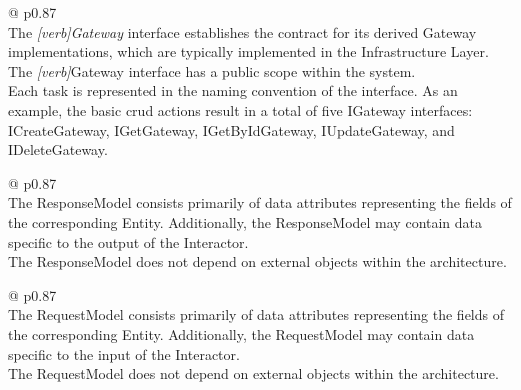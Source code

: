 \begin{table}[H]
    \begin{tabular}{@{\makebox[2em][c]{\rownumber\space}}  p{0.87\linewidth}}
        \\ 
    \hline
    The \textit{[\gls{verb}]Gateway} interface establishes the contract for its derived Gateway
    implementations, which are typically implemented in the Infrastructure Layer. \\

    The \textit{[\gls{verb}]}Gateway interface has a public scope within the system. \\
    
    Each task is represented in the naming convention of the interface. As an example, the
    basic \gls{crud} actions result in a total of five IGateway interfaces: ICreateGateway,
    IGetGateway, IGetByIdGateway, IUpdateGateway, and IDeleteGateway. \\
    \hline
    \end{tabular}
\caption{\textit{[\gls{verb}]}Gateway Requirements}
\label{table_requirements_IGateway}
\end{table}

\begin{table}[H]
    \begin{tabular}{@{\makebox[2em][c]{\rownumber\space}}  p{0.87\linewidth}}
        \\ 
    \hline
    The ResponseModel consists primarily of data attributes representing the fields of the
    corresponding Entity. Additionally, the ResponseModel may contain data specific to the
    output of the Interactor. \\

    The ResponseModel does not depend on external objects within the architecture. \\
    \hline
    \end{tabular}
\caption{ResponseModel Requirements}
\label{table_requirements_responsemodel}
\end{table}

\begin{table}[H]
    \begin{tabular}{@{\makebox[2em][c]{\rownumber\space}}  p{0.87\linewidth}}
        \\ 
    \hline
    The RequestModel consists primarily of data attributes representing the fields of the
    corresponding Entity. Additionally, the RequestModel may contain data specific to the
    input of the Interactor. \\

    The RequestModel does not depend on external objects within the architecture. \\
       
       \hline
    \end{tabular}
\caption{RequestModel Requirements}
\label{table_requirements_requestmodel}
\end{table}


